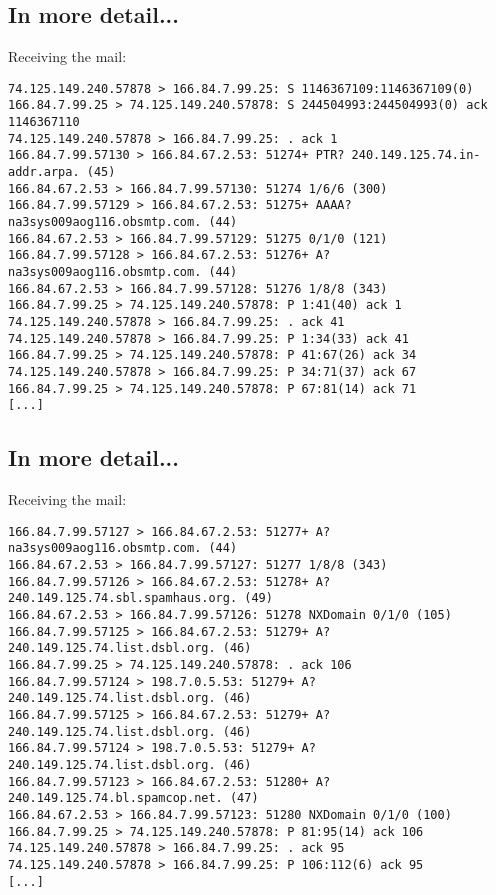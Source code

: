 \documentclass[xga]{xdvislides}
\begin{document}
\subsection{In more detail...}
Receiving the mail:
\begin{verbatim}
74.125.149.240.57878 > 166.84.7.99.25: S 1146367109:1146367109(0)
166.84.7.99.25 > 74.125.149.240.57878: S 244504993:244504993(0) ack 1146367110
74.125.149.240.57878 > 166.84.7.99.25: . ack 1
166.84.7.99.57130 > 166.84.67.2.53: 51274+ PTR? 240.149.125.74.in-addr.arpa. (45)
166.84.67.2.53 > 166.84.7.99.57130: 51274 1/6/6 (300)
166.84.7.99.57129 > 166.84.67.2.53: 51275+ AAAA? na3sys009aog116.obsmtp.com. (44)
166.84.67.2.53 > 166.84.7.99.57129: 51275 0/1/0 (121)
166.84.7.99.57128 > 166.84.67.2.53: 51276+ A? na3sys009aog116.obsmtp.com. (44)
166.84.67.2.53 > 166.84.7.99.57128: 51276 1/8/8 (343)
166.84.7.99.25 > 74.125.149.240.57878: P 1:41(40) ack 1
74.125.149.240.57878 > 166.84.7.99.25: . ack 41
74.125.149.240.57878 > 166.84.7.99.25: P 1:34(33) ack 41
166.84.7.99.25 > 74.125.149.240.57878: P 41:67(26) ack 34
74.125.149.240.57878 > 166.84.7.99.25: P 34:71(37) ack 67
166.84.7.99.25 > 74.125.149.240.57878: P 67:81(14) ack 71
[...]
\end{verbatim}

\subsection{In more detail...}
Receiving the mail:
\begin{verbatim}
166.84.7.99.57127 > 166.84.67.2.53: 51277+ A? na3sys009aog116.obsmtp.com. (44)
166.84.67.2.53 > 166.84.7.99.57127: 51277 1/8/8 (343)
166.84.7.99.57126 > 166.84.67.2.53: 51278+ A? 240.149.125.74.sbl.spamhaus.org. (49)
166.84.67.2.53 > 166.84.7.99.57126: 51278 NXDomain 0/1/0 (105)
166.84.7.99.57125 > 166.84.67.2.53: 51279+ A? 240.149.125.74.list.dsbl.org. (46)
166.84.7.99.25 > 74.125.149.240.57878: . ack 106
166.84.7.99.57124 > 198.7.0.5.53: 51279+ A? 240.149.125.74.list.dsbl.org. (46)
166.84.7.99.57125 > 166.84.67.2.53: 51279+ A? 240.149.125.74.list.dsbl.org. (46)
166.84.7.99.57124 > 198.7.0.5.53: 51279+ A? 240.149.125.74.list.dsbl.org. (46)
166.84.7.99.57123 > 166.84.67.2.53: 51280+ A? 240.149.125.74.bl.spamcop.net. (47)
166.84.67.2.53 > 166.84.7.99.57123: 51280 NXDomain 0/1/0 (100)
166.84.7.99.25 > 74.125.149.240.57878: P 81:95(14) ack 106
74.125.149.240.57878 > 166.84.7.99.25: . ack 95
74.125.149.240.57878 > 166.84.7.99.25: P 106:112(6) ack 95
[...]
\end{verbatim}
\end{document}
